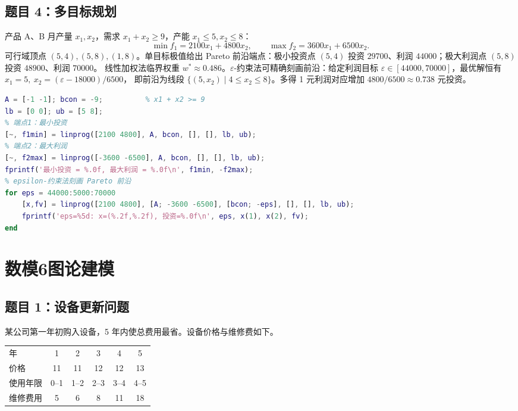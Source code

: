\documentclass[zihao=5,a4paper]{ctexart}
\begin{document}
\subsection{题目 4：多目标规划}
产品 A、B 月产量 $x_1,x_2$，需求 $x_1+x_2\ge9$，产能 $x_1\le5,x_2\le8$：
\[
\min f_1=2100x_1+4800x_2,\qquad \max f_2=3600x_1+6500x_2.
\]
可行域顶点 $(5,4),(5,8),(1,8)$。单目标极值给出 Pareto 前沿端点：极小投资点 $(5,4)$
投资 $29700$、利润 $44000$；极大利润点 $(5,8)$ 投资 $48900$、利润 $70000$。
线性加权法临界权重 $w^*\approx0.486$。$\varepsilon$-约束法可精确刻画前沿：给定利润目标
$\varepsilon\in[44000,70000]$，最优解恒有 $x_1=5,\ x_2=(\varepsilon-18000)/6500$，
即前沿为线段 $\{(5,x_2)\mid4\le x_2\le8\}$。多得 1 元利润对应增加 $4800/6500\approx0.738$ 元投资。

\begin{lstlisting}[language=Matlab]
A = [-1 -1]; bcon = -9;          % x1 + x2 >= 9
lb = [0 0]; ub = [5 8];
% 端点1：最小投资
[~, f1min] = linprog([2100 4800], A, bcon, [], [], lb, ub);
% 端点2：最大利润
[~, f2max] = linprog([-3600 -6500], A, bcon, [], [], lb, ub);
fprintf('最小投资 = %.0f, 最大利润 = %.0f\n', f1min, -f2max);
% epsilon-约束法刻画 Pareto 前沿
for eps = 44000:5000:70000
    [x,fv] = linprog([2100 4800], [A; -3600 -6500], [bcon; -eps], [], [], lb, ub);
    fprintf('eps=%5d: x=(%.2f,%.2f), 投资=%.0f\n', eps, x(1), x(2), fv);
end
\end{lstlisting}

\section{数模6图论建模}

\subsection{题目 1：设备更新问题}
某公司第一年初购入设备，5 年内使总费用最省。设备价格与维修费如下。

\begin{table}[H]
\centering\small
\begin{tabular}{lccccc}
\toprule
年 & 1 & 2 & 3 & 4 & 5\\
价格 & 11 & 11 & 12 & 12 & 13\\
\midrule
使用年限 & 0--1 & 1--2 & 2--3 & 3--4 & 4--5\\
维修费用 & 5 & 6 & 8 & 11 & 18\\
\bottomrule
\end{tabular}
\end{table}
\end{document}
